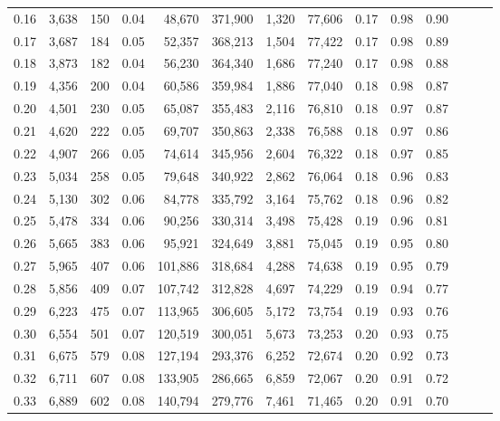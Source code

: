 \begin{tabular}{rrrrrrrrrrrrrr}
0.16 &   3,638 &    150 &  0.04 &   48,670 &  371,900 &   1,320 &  77,606 &  0.17 &  0.98 &      0.90 \\
0.17 &   3,687 &    184 &  0.05 &   52,357 &  368,213 &   1,504 &  77,422 &  0.17 &  0.98 &      0.89 \\
0.18 &   3,873 &    182 &  0.04 &   56,230 &  364,340 &   1,686 &  77,240 &  0.17 &  0.98 &      0.88 \\
0.19 &   4,356 &    200 &  0.04 &   60,586 &  359,984 &   1,886 &  77,040 &  0.18 &  0.98 &      0.87 \\
0.20 &   4,501 &    230 &  0.05 &   65,087 &  355,483 &   2,116 &  76,810 &  0.18 &  0.97 &      0.87 \\
0.21 &   4,620 &    222 &  0.05 &   69,707 &  350,863 &   2,338 &  76,588 &  0.18 &  0.97 &      0.86 \\
0.22 &   4,907 &    266 &  0.05 &   74,614 &  345,956 &   2,604 &  76,322 &  0.18 &  0.97 &      0.85 \\
0.23 &   5,034 &    258 &  0.05 &   79,648 &  340,922 &   2,862 &  76,064 &  0.18 &  0.96 &      0.83 \\
0.24 &   5,130 &    302 &  0.06 &   84,778 &  335,792 &   3,164 &  75,762 &  0.18 &  0.96 &      0.82 \\
0.25 &   5,478 &    334 &  0.06 &   90,256 &  330,314 &   3,498 &  75,428 &  0.19 &  0.96 &      0.81 \\
0.26 &   5,665 &    383 &  0.06 &   95,921 &  324,649 &   3,881 &  75,045 &  0.19 &  0.95 &      0.80 \\
0.27 &   5,965 &    407 &  0.06 &  101,886 &  318,684 &   4,288 &  74,638 &  0.19 &  0.95 &      0.79 \\
0.28 &   5,856 &    409 &  0.07 &  107,742 &  312,828 &   4,697 &  74,229 &  0.19 &  0.94 &      0.77 \\
0.29 &   6,223 &    475 &  0.07 &  113,965 &  306,605 &   5,172 &  73,754 &  0.19 &  0.93 &      0.76 \\
0.30 &   6,554 &    501 &  0.07 &  120,519 &  300,051 &   5,673 &  73,253 &  0.20 &  0.93 &      0.75 \\
0.31 &   6,675 &    579 &  0.08 &  127,194 &  293,376 &   6,252 &  72,674 &  0.20 &  0.92 &      0.73 \\
0.32 &   6,711 &    607 &  0.08 &  133,905 &  286,665 &   6,859 &  72,067 &  0.20 &  0.91 &      0.72 \\
0.33 &   6,889 &    602 &  0.08 &  140,794 &  279,776 &   7,461 &  71,465 &  0.20 &  0.91 &      0.70 \\

\end{tabular}
